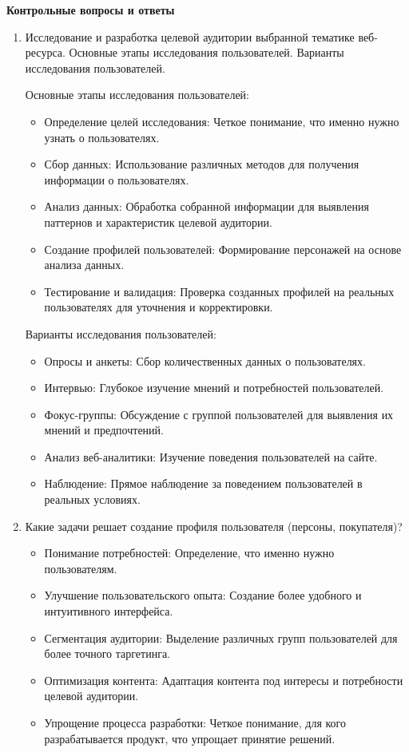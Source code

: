 \textbf{Контрольные вопросы и ответы}

\begin{enumerate}
\item Исследование и разработка целевой аудитории выбранной тематике веб-ресурса. Основные этапы исследования пользователей. Варианты исследования пользователей.
    \bigskip

Основные этапы исследования пользователей:

        \begin{itemize}
            \item Определение целей исследования: Четкое понимание, что именно нужно узнать о пользователях.
            \item Сбор данных: Использование различных методов для получения информации о пользователях.
            \item Анализ данных: Обработка собранной информации для выявления паттернов и характеристик целевой аудитории.
            \item Создание профилей пользователей: Формирование персонажей на основе анализа данных.
            \item Тестирование и валидация: Проверка созданных профилей на реальных пользователях для уточнения и корректировки.
        \end{itemize}
    \bigskip

Варианты исследования пользователей:

        \begin{itemize}
            \item Опросы и анкеты: Сбор количественных данных о пользователях.
            \item Интервью: Глубокое изучение мнений и потребностей пользователей.
            \item Фокус-группы: Обсуждение с группой пользователей для выявления их мнений и предпочтений.
            \item Анализ веб-аналитики: Изучение поведения пользователей на сайте.
            \item Наблюдение: Прямое наблюдение за поведением пользователей в реальных условиях.
        \end{itemize}
\item Какие задачи решает создание профиля пользователя (персоны, покупателя)?

    \begin{itemize}
        \item Понимание потребностей: Определение, что именно нужно пользователям.
        \item Улучшение пользовательского опыта: Создание более удобного и интуитивного интерфейса.
        \item Сегментация аудитории: Выделение различных групп пользователей для более точного таргетинга.
        \item Оптимизация контента: Адаптация контента под интересы и потребности целевой аудитории.
        \item Упрощение процесса разработки: Четкое понимание, для кого разрабатывается продукт, что упрощает принятие решений.
    \end{itemize}


\end{enumerate}
